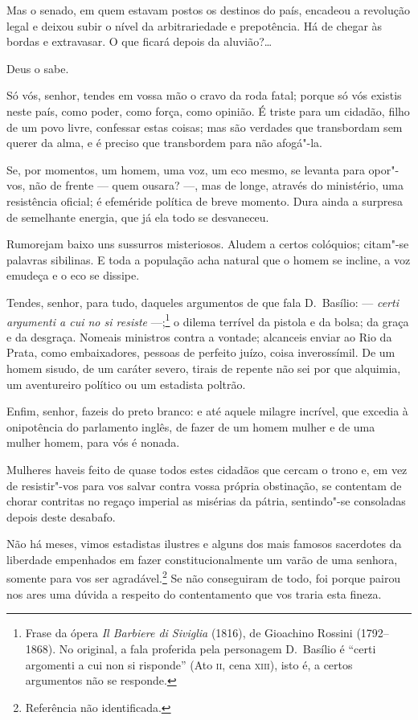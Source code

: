  Mas o senado, em quem estavam postos os destinos do país, encadeou a
revolução legal e deixou subir o nível da arbitrariedade e prepotência.
Há de chegar às bordas e extravasar. O que ficará depois da aluvião?\ldots{}

 Deus o sabe. 

 Só vós, senhor, tendes em vossa mão o cravo da roda fatal; porque só
vós existis neste país, como poder, como força, como opinião. É triste
para um cidadão, filho de um povo livre, confessar estas coisas; mas
são verdades que transbordam sem querer da alma, e é preciso que
transbordem para não afogá"-la. 

 Se, por momentos, um homem, uma voz, um eco mesmo, se levanta para
opor"-vos, não de frente --- quem ousara? ---, mas de longe, através do
ministério, uma resistência oficial; é efeméride política de breve
momento. Dura ainda a surpresa de semelhante energia, que já ela todo
se desvaneceu. 

 Rumorejam baixo uns sussurros misteriosos. Aludem a certos colóquios;
citam"-se palavras sibilinas. E toda a população acha natural que o
homem se incline, a voz emudeça e o eco se dissipe. 

 Tendes, senhor, para tudo, daqueles argumentos de que fala D.~Basílio:
--- \textit{certi argumenti a cui no si resiste} ---;\footnote{ Frase da ópera 
\textit{Il Barbiere di Siviglia} (1816), de Gioachino Rossini
(1792--1868). No original, a fala proferida pela personagem D.~Basílio
é ``certi argomenti a cui non si risponde'' (Ato \textsc{ii}, cena \textsc{xiii}), isto é, a
certos argumentos não se responde.}
 o dilema terrível da pistola e da bolsa; da graça e da desgraça.
Nomeais ministros contra a vontade; alcanceis enviar ao Rio da Prata,
como embaixadores, pessoas de perfeito juízo, coisa inverossímil. De um
homem sisudo, de um caráter severo, tirais de repente não sei por que
alquimia, um aventureiro político ou um estadista poltrão. 

 Enfim, senhor, fazeis do preto branco: e até aquele milagre incrível,
que excedia à onipotência do parlamento inglês, de fazer de um homem
mulher e de uma mulher homem, para vós é nonada.

 Mulheres haveis feito de quase todos estes cidadãos que cercam o trono
e, em vez de resistir"-vos para vos salvar contra vossa própria
obstinação, se contentam de chorar contritas no regaço imperial as
misérias da pátria, sentindo"-se consoladas depois deste desabafo.

Não há meses, vimos estadistas ilustres e alguns dos mais famosos
sacerdotes da liberdade empenhados em fazer constitucionalmente um
varão de uma senhora, somente para vos ser
agradável.\footnote{ Referência não identificada.}
 Se não conseguiram de todo, foi porque pairou nos ares uma dúvida a
respeito do contentamento que vos traria esta fineza. 

